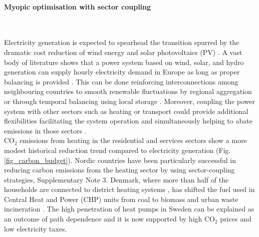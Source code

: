 \documentclass[5p]{elsarticle} %
\begin{document}
\FloatBarrier

\paragraph{\textbf{Myopic optimisation with sector coupling}} \

Electricity generation is expected to spearhead the transition spurred by the dramatic cost reduction of wind energy \cite{Lantz_2012} and solar photovoltaics (PV) \cite{Creutzig_2017, Haegel_2019}. A vast body of literature shows that a power system based on wind, solar, and hydro generation can supply hourly electricity demand in Europe as long as proper balancing is provided \cite{Eriksen_2017, Schlachtberger_2017, Gils_2017a, Brown_response}. This can be done reinforcing interconnections among neighbouring countries \cite{Rodriguez_2014} to smooth renewable fluctuations by regional aggregation or through temporal balancing using local storage \cite{Rasmussen_2012, Cebulla_2017, Victoria_2019_storage}. Moreover, coupling the power system with other sectors such as heating or transport could provide additional flexibilities facilitating the system operation and simultaneously helping to abate emissions in those sectors \cite{Connolly_2016, Brown_2018, Child_2019}. \\

CO$_2$ emissions from heating in the residential and services sectors show a more modest historical reduction trend compared to electricity generation (Fig. \ref{fig_carbon_budget}). Nordic countries have been particularly successful in reducing carbon emissions from the heating sector by using sector-coupling strategies, Supplementary Note 3. Denmark, where more than half of the households are connected to district heating systems \cite{Gross_2019}, has shifted the fuel used in Central Heat and Power (CHP) units from coal to biomass and urban waste incineration \cite{DEA_2015}. The high penetration of heat pumps in Sweden can be explained as an outcome of path dependence \cite{Gross_2019} and it is now supported by high CO$_2$ prices \cite{Carbon_pricing_2019} and low electricity taxes.\\ 
\end{document}
